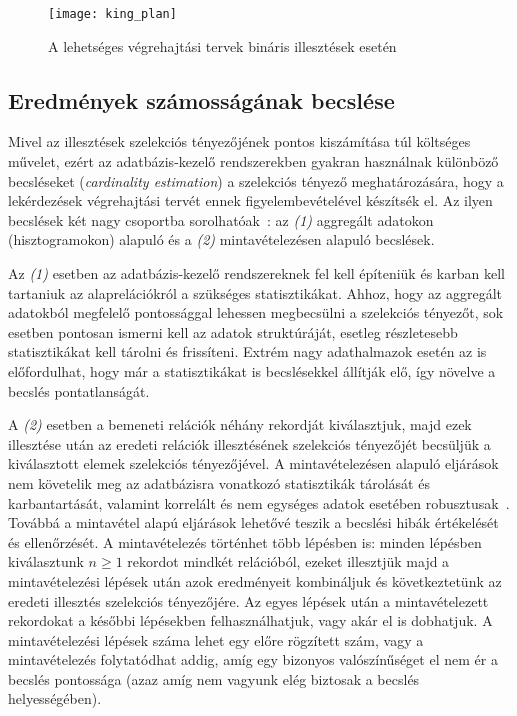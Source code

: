 \begin{figure}[ht]
	\centering
	\texttt{[image: king\_plan]}
	\caption{A lehetséges végrehajtási tervek bináris illesztések esetén~\cite{DBLP:journals/sigmod/NgoRR13}}
	\label{fig:king_plan}
\end{figure}

\subsection{Eredmények számosságának becslése}
Mivel az illesztések szelekciós tényezőjének pontos kiszámítása túl költséges művelet, ezért az adatbázis-kezelő rendszerekben gyakran használnak különböző becsléseket (\emph{cardinality estimation}) a szelekciós tényező meghatározására, hogy a lekérdezések végrehajtási tervét ennek figyelembevételével készítsék el.
Az ilyen becslések két nagy csoportba sorolhatóak~\cite{DBLP:journals/vldb/LeisRGMBKN18}:
az \textit{(1)} aggregált adatokon (hisztogramokon) alapuló és
a \textit{(2)} mintavételezésen alapuló becslések.

Az \textit{(1)} esetben az adatbázis-kezelő rendszereknek fel kell építeniük és karban kell tartaniuk az alaprelációkról a szükséges statisztikákat. Ahhoz, hogy az aggregált adatokból megfelelő pontossággal lehessen megbecsülni a szelekciós tényezőt, sok esetben pontosan ismerni kell az adatok struktúráját, esetleg részletesebb statisztikákat kell tárolni és frissíteni. Extrém nagy adathalmazok esetén az is előfordulhat, hogy már a statisztikákat is becslésekkel állítják elő, így növelve a becslés pontatlanságát.

A \textit{(2)} esetben a bemeneti relációk néhány rekordját kiválasztjuk, majd ezek illesztése után az eredeti relációk illesztésének szelekciós tényezőjét becsüljük a kiválasztott elemek szelekciós tényezőjével. A mintavételezésen alapuló eljárások nem követelik meg az adatbázisra vonatkozó statisztikák tárolását és karbantartását, valamint korrelált és nem egységes adatok esetében robusztusak~\cite{DBLP:journals/jcss/HaasNSS96}. Továbbá a mintavétel alapú eljárások lehetővé teszik a becslési hibák értékelését és ellenőrzését. A mintavételezés történhet több lépésben is: minden lépésben kiválasztunk $ n \ge 1$ rekordot mindkét relációból, ezeket illesztjük majd a mintavételezési lépések után azok eredményeit kombináljuk és következtetünk az eredeti illesztés szelekciós tényezőjére. Az egyes lépések után a mintavételezett rekordokat a későbbi lépésekben felhasználhatjuk, vagy akár el is dobhatjuk. A mintavételezési lépések száma lehet egy előre rögzített szám, vagy a mintavételezés folytatódhat addig, amíg egy bizonyos valószínűséget el nem ér a becslés pontossága (azaz amíg nem vagyunk elég biztosak a becslés helyességében).

